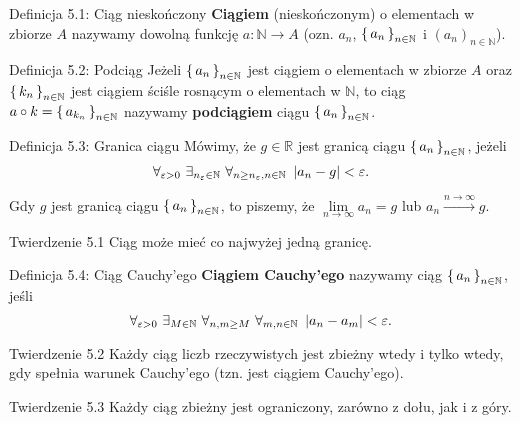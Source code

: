 \documentclass{article}
\newcommand{\hquad}{\mkern9mu}
\newcommand{\R}{\mathbb{R}}
\newcommand{\N}{\mathbb{N}}
\newcommand{\lin}[1]{\lim\limits_{n\to\infty}{#1}}
\newcommand{\arn}{\xrightarrow{n\to\infty}}
\newcommand{\seq}[1]{\set{#1_n}_{n\in\N}}
\begin{document}
\begin{defr}{Definicja 5.1: Ciąg nieskończony}
    \textbf{Ciągiem} (nieskończonym) o elementach w zbiorze \(A\)
    nazywamy dowolną funkcję $a:\N\to A$ (ozn. $a_n$, $\set{a_n}_{n\in\N}$
    i $(a_n)_{n\in\N}$).
\end{defr}

\begin{defr}{Definicja 5.2: Podciąg}
    Jeżeli $\seq{a}$ jest ciągiem o elementach w zbiorze $A$ oraz
    $\seq{k}$ jest ciągiem ściśle rosnącym o elementach w $\N$,
    to ciąg $a\circ k=\set{a_{k_n}}_{n\in\N}$ nazywamy \textbf{podciągiem}
    ciągu $\seq{a}$.
\end{defr}

\begin{defr}{Definicja 5.3: Granica ciągu}
    Mówimy, że $g\in \R$ jest granicą ciągu $\seq{a}$, jeżeli
    \begin{equation*}
        \forall_{\varepsilon>0}\ \exists_{n_\varepsilon\in\N}\ 
        \forall_{n\ge n_\varepsilon, n\in\N}\hquad
        |a_n-g|<\varepsilon.
    \end{equation*}
\end{defr}

Gdy $g$ jest granicą ciągu $\seq{a}$, to piszemy, że $\lin{a_n}=g$
lub $a_n\arn g$.

\begin{twier}{Twierdzenie 5.1}
    Ciąg może mieć co najwyżej jedną granicę.
\end{twier}

\begin{defr}{Definicja 5.4: Ciąg Cauchy'ego}
    \textbf{Ciągiem Cauchy'ego} nazywamy ciąg $\seq{a}$, jeśli
    \begin{equation*}
        \forall_{\varepsilon>0}\ \exists_{M\in\N}\
        \forall_{n,m\geq M}\ \forall_{m,n\in\N}\hquad
        |a_n-a_m|<\varepsilon.
    \end{equation*}
\end{defr}

\begin{twier}{Twierdzenie 5.2}
    Każdy ciąg liczb rzeczywistych jest zbieżny wtedy i tylko wtedy, gdy spełnia warunek Cauchy'ego (tzn. jest ciągiem Cauchy'ego).
\end{twier}

\begin{twier}{Twierdzenie 5.3}
    Każdy ciąg zbieżny jest ograniczony, zarówno z dołu, jak i z góry.
\end{twier}
\end{document}
